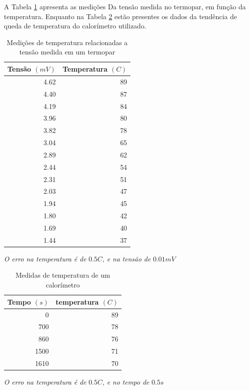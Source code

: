 \documentclass[12pt,a4paper]{article}
\begin{document}
A Tabela \ref{dadostermopar} apresenta as medições Da tensão medida no termopar, em função da temperatura. Enquanto na Tabela \ref{dadostempo} estão presentes os
dados da tendência de queda de temperatura do calorímetro utilizado.

\newpage
\begin{table}[!htbp]

\centering
\def\arraystretch{1.5}
\caption{Medições de temperatura relacionadas a tensão medida em um termopar}

\begin{tabular}{|r|r|}
\hline
Tensão $(mV)$ & Temperatura $(C)$\\
\hline
 4.62 & 89 \\
 \hline
 4.40  & 87 \\
 \hline
 4.19 & 84 \\
 \hline
 3.96 & 80 \\
 \hline
 3.82 & 78 \\
 \hline
 3.04 & 65 \\
 \hline
 2.89 & 62 \\
 \hline
 2.44 & 54 \\
 \hline
 2.31 & 51 \\
 \hline
 2.03 & 47 \\
 \hline
 1.94 & 45 \\
 \hline
 1.80  & 42 \\
 \hline
 1.69 & 40 \\
 \hline
 1.44 & 37 \\
\hline
\end{tabular}

\emph{O erro na temperatura é de $0.5 C$, e na tensão de $0.01 mV$}
\label{dadostermopar}
\end{table}

\begin{table}[!htbp]

\centering
\def\arraystretch{1.5}
\caption{Medidas de temperatura de um calorímetro}

\begin{tabular}{|r|r|}
\hline
Tempo $(s)$ & temperatura $(C)$ \\
\hline
    0 & 89 \\    
  700 & 78 \\
  860 & 76 \\
 1500 & 71 \\
 1610 & 70 \\
\hline
\end{tabular}

\emph{O erro na temperatura é de $0.5 C$, e no tempo de $0.5 s$}
\label{dadostempo}
\end{table}
\end{document}
